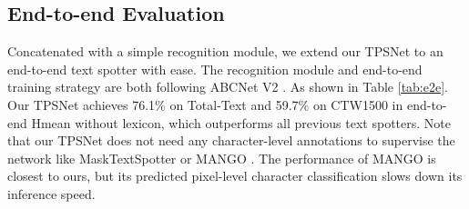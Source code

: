 \documentclass[sigconf]{acmart}
\begin{document}
	
	
	\subsection{
End-to-end Evaluation}
	Concatenated with a simple recognition module, we extend our TPSNet to an end-to-end text spotter with ease. The recognition module and end-to-end training strategy are both following ABCNet V2 \cite{abcnetv2}. As shown in Table \ref{tab:e2e}. Our TPSNet achieves 76.1\% on Total-Text and 59.7\% on CTW1500 in end-to-end Hmean without lexicon, which outperforms all previous text spotters. Note that our TPSNet does not need any character-level annotations to supervise the network like MaskTextSpotter \cite{liao2020masktextspotterv3} or MANGO \cite{qiao2021mango}. The performance of MANGO \cite{qiao2021mango} is closest to ours, but its predicted pixel-level character classification slows down its inference speed.
	
\end{document}

